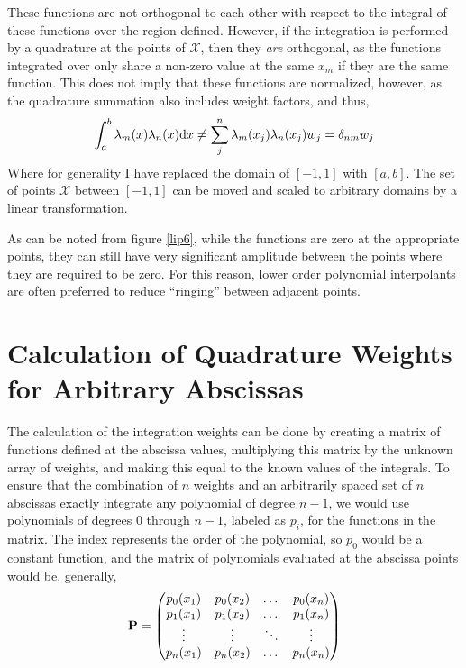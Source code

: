 \documentclass[preprint]{revtex4}
\newcommand{\dx}{{\rm d}x}
\begin{document}
These functions are not orthogonal to each other with respect to the integral of 
these functions over the region defined. However, if the integration is performed
by a quadrature at the points of $\mathcal X$, then they {\it are} orthogonal, as
the functions integrated over only share a non-zero value at the same $x_m$ if they 
are the same function. This does not imply that these functions are normalized, 
however, as the quadrature summation also includes weight factors, and thus, 
\begin{equation}
\label{liportho}
\int_{a}^{b}\lambda_m(x)\lambda_n(x)\dx \ne \sum_j^n\lambda_m(x_j)\lambda_n(x_j)w_j = \delta_{nm}w_j
\end{equation}
Where for generality I have replaced the domain of $[-1,1]$ with $[a,b]$. The
set of points $\mathcal X$ between $[-1,1]$ can be moved and scaled to arbitrary domains
by a linear transformation. 

As can be noted from figure \ref{lip6}, while the functions are zero at the 
appropriate points, they can still have very significant amplitude between the points
where they are required to be zero. For this reason, lower order polynomial 
interpolants are often preferred to reduce ``ringing'' between adjacent points. 

\section{Calculation of Quadrature Weights for Arbitrary Abscissas}
The calculation of the integration weights can be done by creating a matrix of functions
defined at the abscissa values, multiplying this matrix by the unknown array of weights, 
and making this equal to the known values of the integrals. To ensure that the combination
of $n$ weights and an arbitrarily spaced set of $n$ abscissas exactly integrate any 
polynomial of degree $n-1$, we would use polynomials of degrees $0$ through $n-1$,
labeled as $p_i$, for the functions in the matrix. The index represents the 
order of the polynomial, so $p_0$ would be a constant function, and the matrix 
of polynomials evaluated at the abscissa points would be, generally, 
\begin{equation}
\label{genPmat}
{\bf P} = 
\begin{pmatrix}
p_0(x_1) & p_0(x_2) & \dots & p_0(x_n) \\
p_1(x_1) & p_1(x_2) & \dots & p_1(x_n) \\
\vdots & \vdots & \ddots & \vdots \\
p_n(x_1) & p_n(x_2) & \dots & p_n(x_n) 
\end{pmatrix}
\end{equation}
\end{document}
